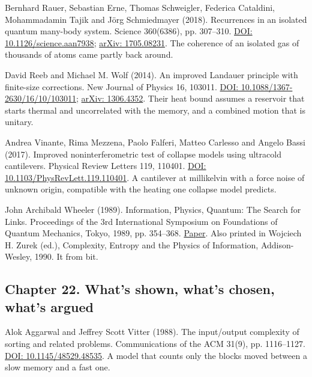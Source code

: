 \documentclass[11pt,twoside]{article}
\theoremstyle{thielethm}
\theoremstyle{thieledef}
\theoremstyle{thieledef}
\theoremstyle{thieledef}
\theoremstyle{thielethm}
\theoremstyle{thieleobs}
\theoremstyle{thielethm}
\begin{document}
\noindent Bernhard Rauer, Sebastian Erne, Thomas Schweigler, Federica Cataldini, Mohammadamin Tajik and J\"org Schmiedmayer (2018). Recurrences in an isolated quantum many-body system. Science 360(6386), pp. 307--310. \href{https://doi.org/10.1126/science.aan7938}{DOI: 10.1126/science.aan7938}; \href{https://arxiv.org/abs/1705.08231}{arXiv: 1705.08231}. The coherence of an isolated gas of thousands of atoms came partly back around.
\par\medskip

\noindent David Reeb and Michael M. Wolf (2014). An improved Landauer principle with finite-size corrections. New Journal of Physics 16, 103011. \href{https://doi.org/10.1088/1367-2630/16/10/103011}{DOI: 10.1088/1367-2630/16/10/103011}; \href{https://arxiv.org/abs/1306.4352}{arXiv: 1306.4352}. Their heat bound assumes a reservoir that starts thermal and uncorrelated with the memory, and a combined motion that is unitary.
\par\medskip

\noindent Andrea Vinante, Rima Mezzena, Paolo Falferi, Matteo Carlesso and Angelo Bassi (2017). Improved noninterferometric test of collapse models using ultracold cantilevers. Physical Review Letters 119, 110401. \href{https://doi.org/10.1103/PhysRevLett.119.110401}{DOI: 10.1103/PhysRevLett.119.110401}. A cantilever at millikelvin with a force noise of unknown origin, compatible with the heating one collapse model predicts.
\par\medskip

\noindent John Archibald Wheeler (1989). Information, Physics, Quantum: The Search for Links. Proceedings of the 3rd International Symposium on Foundations of Quantum Mechanics, Tokyo, 1989, pp. 354--368. \href{https://jawarchive.files.wordpress.com/2012/03/informationquantumphysics.pdf}{Paper}. Also printed in Wojciech H. Zurek (ed.), Complexity, Entropy and the Physics of Information, Addison-Wesley, 1990. It from bit.
\par\medskip

\subsection*{Chapter 22. What's shown, what's chosen, what's argued}

\noindent Alok Aggarwal and Jeffrey Scott Vitter (1988). The input/output complexity of sorting and related problems. Communications of the ACM 31(9), pp. 1116--1127. \href{https://doi.org/10.1145/48529.48535}{DOI: 10.1145/48529.48535}. A model that counts only the blocks moved between a slow memory and a fast one.
\par\medskip
\end{document}

